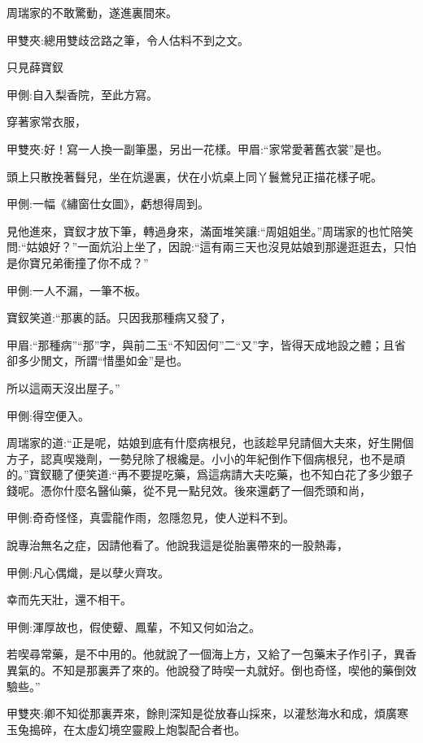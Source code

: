 \begin{parag}
    周瑞家的不敢驚動，遂進裏間來。\begin{note}甲雙夾:總用雙歧岔路之筆，令人估料不到之文。\end{note}只見薛寶釵\begin{note}甲側:自入梨香院，至此方寫。\end{note}穿著家常衣服，\begin{note}甲雙夾:好！寫一人換一副筆墨，另出一花樣。甲眉:“家常愛著舊衣裳”是也。\end{note}頭上只散挽著䰖兒，坐在炕邊裏，伏在小炕桌上同丫鬟鶯兒正描花樣子呢。\begin{note}甲側:一幅《繡窗仕女圖》，虧想得周到。\end{note}見他進來，寶釵才放下筆，轉過身來，滿面堆笑讓:“周姐姐坐。”周瑞家的也忙陪笑問:“姑娘好？”一面炕沿上坐了，因說:“這有兩三天也沒見姑娘到那邊逛逛去，只怕是你寶兄弟衝撞了你不成？”\begin{note}甲側:一人不漏，一筆不板。\end{note}寶釵笑道:“那裏的話。只因我那種病又發了，\begin{note}甲眉:“那種病”“那”字，與前二玉“不知因何”二“又”字，皆得天成地設之體；且省卻多少閒文，所謂“惜墨如金”是也。\end{note}所以這兩天沒出屋子。”\begin{note}甲側:得空便入。\end{note}周瑞家的道:“正是呢，姑娘到底有什麼病根兒，也該趁早兒請個大夫來，好生開個方子，認真喫幾劑，一勢兒除了根纔是。小小的年紀倒作下個病根兒，也不是頑的。”寶釵聽了便笑道:“再不要提吃藥，爲這病請大夫吃藥，也不知白花了多少銀子錢呢。憑你什麼名醫仙藥，從不見一點兒效。後來還虧了一個禿頭和尚，\begin{note}甲側:奇奇怪怪，真雲龍作雨，忽隱忽見，使人逆料不到。\end{note}說專治無名之症，因請他看了。他說我這是從胎裏帶來的一股熱毒，\begin{note}甲側:凡心偶熾，是以孽火齊攻。\end{note}幸而先天壯，還不相干。\begin{note}甲側:渾厚故也，假使顰、鳳輩，不知又何如治之。\end{note}若喫尋常藥，是不中用的。他就說了一個海上方，又給了一包藥末子作引子，異香異氣的。不知是那裏弄了來的。他說發了時喫一丸就好。倒也奇怪，喫他的藥倒效驗些。”\begin{note}甲雙夾:卿不知從那裏弄來，餘則深知是從放春山採來，以灌愁海水和成，煩廣寒玉兔搗碎，在太虛幻境空靈殿上炮製配合者也。\end{note}
\end{parag}


